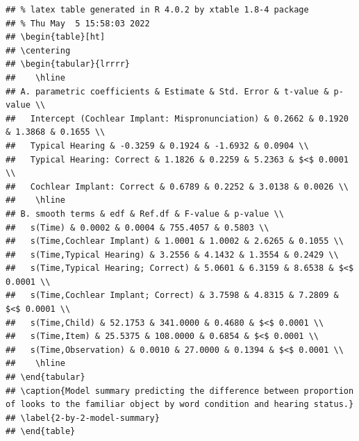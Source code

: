 \documentclass[
]{article}
\begin{document}
\begin{verbatim}
## % latex table generated in R 4.0.2 by xtable 1.8-4 package
## % Thu May  5 15:58:03 2022
## \begin{table}[ht]
## \centering
## \begin{tabular}{lrrrr}
##    \hline
## A. parametric coefficients & Estimate & Std. Error & t-value & p-value \\ 
##   Intercept (Cochlear Implant: Mispronunciation) & 0.2662 & 0.1920 & 1.3868 & 0.1655 \\ 
##   Typical Hearing & -0.3259 & 0.1924 & -1.6932 & 0.0904 \\ 
##   Typical Hearing: Correct & 1.1826 & 0.2259 & 5.2363 & $<$ 0.0001 \\ 
##   Cochlear Implant: Correct & 0.6789 & 0.2252 & 3.0138 & 0.0026 \\ 
##    \hline
## B. smooth terms & edf & Ref.df & F-value & p-value \\ 
##   s(Time) & 0.0002 & 0.0004 & 755.4057 & 0.5803 \\ 
##   s(Time,Cochlear Implant) & 1.0001 & 1.0002 & 2.6265 & 0.1055 \\ 
##   s(Time,Typical Hearing) & 3.2556 & 4.1432 & 1.3554 & 0.2429 \\ 
##   s(Time,Typical Hearing; Correct) & 5.0601 & 6.3159 & 8.6538 & $<$ 0.0001 \\ 
##   s(Time,Cochlear Implant; Correct) & 3.7598 & 4.8315 & 7.2809 & $<$ 0.0001 \\ 
##   s(Time,Child) & 52.1753 & 341.0000 & 0.4680 & $<$ 0.0001 \\ 
##   s(Time,Item) & 25.5375 & 108.0000 & 0.6854 & $<$ 0.0001 \\ 
##   s(Time,Observation) & 0.0010 & 27.0000 & 0.1394 & $<$ 0.0001 \\ 
##    \hline
## \end{tabular}
## \caption{Model summary predicting the difference between proportion of looks to the familiar object by word condition and hearing status.} 
## \label{2-by-2-model-summary}
## \end{table}
\end{verbatim}
\end{document}
